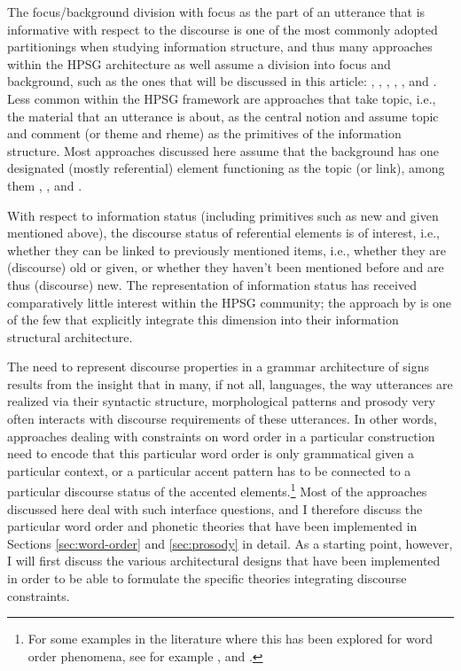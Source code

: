 \documentclass[output=paper
                ,modfonts
                ,nonflat
	        ,collection
	        ,collectionchapter
	        ,collectiontoclongg
 	        ,biblatex
                ,babelshorthands
                ,newtxmath
                ,draftmode
                ,colorlinks, citecolor=brown
]{./langsci/langscibook}
\begin{document}
The focus/background division with focus as the part of an utterance
that is informative with respect to the discourse is one of the most
commonly adopted partitionings when studying information structure, and
thus many approaches within the HPSG architecture as well assume a
division into focus and background, such as the ones that will be
discussed in this article: \cite{EV96a}, \cite{deKuthy2002a},
\cite{Webelhuth2007a-u}, \cite{Paggio2009a-u}, \cite{Bildhauer2008a},
\cite{song-bender:2012} and \cite{song2018}. Less common within the
HPSG framework are approaches that take topic, i.e., the material that
an utterance is about, as the central notion and assume topic and
comment (or theme and rheme) as the primitives of the information
structure. Most approaches discussed here assume that the background
has one designated (mostly referential) element functioning as the
topic (or link), among them \cite{EV96a}, \cite{deKuthy2002a},
\cite{Paggio2009a-u} and \cite{song2018}.

With respect to information status (including primitives such as new and
given mentioned above), the discourse status of referential elements is of
interest, i.e., whether they can be linked to previously mentioned
items, i.e., whether they are (discourse) old or given, or whether they
haven't been mentioned before and are thus (discourse) new. The
representation of information status has received comparatively little
interest within the HPSG community; the approach by
\cite{DeKuthy.Meurers-11} is one of the few that
explicitly integrate this dimension into their information structural
architecture.

The need to represent discourse properties in a grammar architecture
of signs results from the insight that in many, if not all, languages,
the way utterances are realized via their syntactic structure,
morphological patterns and prosody very often interacts with discourse
requirements of these utterances. In other words, approaches dealing
with constraints on word order in a particular construction need to
encode that this particular word order is only grammatical given a
particular context, or a particular accent pattern has to be connected
to a particular discourse status of the accented elements.\footnote{For some examples in the literature where this has been explored for word order phenomena, see for example \citet{ambridge.goldberg-08}, \citet{DeKuthy.Konietzko-19} and \citet{Culicover.Winkler-19}. }
Most of the approaches discussed here deal with such interface
questions, and I therefore discuss the particular word order and
phonetic theories that have been implemented in Sections \ref{sec:word-order}
and \ref{sec:prosody} in detail. As a starting point, however, I will first
discuss the various architectural designs that have been implemented in
order to be able to formulate the specific theories integrating
discourse constraints.
\end{document}
